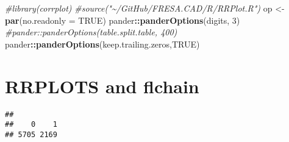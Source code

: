 \documentclass[
]{article}
\newenvironment{Shaded}{\begin{snugshade}}{\end{snugshade}}
\newcommand{\AttributeTok}[1]{\textcolor[rgb]{0.13,0.29,0.53}{#1}}
\newcommand{\CommentTok}[1]{\textcolor[rgb]{0.56,0.35,0.01}{\textit{#1}}}
\newcommand{\ConstantTok}[1]{\textcolor[rgb]{0.56,0.35,0.01}{#1}}
\newcommand{\DecValTok}[1]{\textcolor[rgb]{0.00,0.00,0.81}{#1}}
\newcommand{\FunctionTok}[1]{\textcolor[rgb]{0.13,0.29,0.53}{\textbf{#1}}}
\newcommand{\NormalTok}[1]{#1}
\newcommand{\OtherTok}[1]{\textcolor[rgb]{0.56,0.35,0.01}{#1}}
\newcommand{\SpecialCharTok}[1]{\textcolor[rgb]{0.81,0.36,0.00}{\textbf{#1}}}
\newcommand{\StringTok}[1]{\textcolor[rgb]{0.31,0.60,0.02}{#1}}
\begin{document}
\begin{Shaded}
\begin{Highlighting}[]
\CommentTok{\#library(corrplot)}
\CommentTok{\#source("\textasciitilde{}/GitHub/FRESA.CAD/R/RRPlot.R")}
\NormalTok{op }\OtherTok{\textless{}{-}} \FunctionTok{par}\NormalTok{(}\AttributeTok{no.readonly =} \ConstantTok{TRUE}\NormalTok{)}
\NormalTok{pander}\SpecialCharTok{::}\FunctionTok{panderOptions}\NormalTok{(}\StringTok{\textquotesingle{}digits\textquotesingle{}}\NormalTok{, }\DecValTok{3}\NormalTok{)}
\CommentTok{\#pander::panderOptions(\textquotesingle{}table.split.table\textquotesingle{}, 400)}
\NormalTok{pander}\SpecialCharTok{::}\FunctionTok{panderOptions}\NormalTok{(}\StringTok{\textquotesingle{}keep.trailing.zeros\textquotesingle{}}\NormalTok{,}\ConstantTok{TRUE}\NormalTok{)}
\end{Highlighting}
\end{Shaded}

\hypertarget{rrplots-and-flchain}{%
\section{RRPLOTS and flchain}\label{rrplots-and-flchain}}

\begin{Shaded}
\end{Shaded}

\begin{verbatim}
## 
##    0    1 
## 5705 2169
\end{verbatim}

\begin{Shaded}
\end{Shaded}
\end{document}
